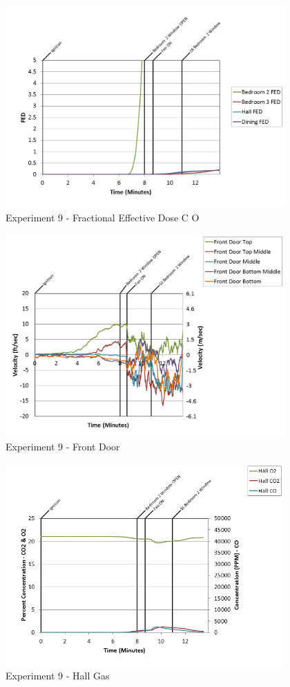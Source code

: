 \documentclass{article}
\begin{document}
\begin{appendices}
\begin{figure}[h!]
	\centering
	\includegraphics[height=3.05in]{0_Images/Results_Charts/Exp_9_Charts/FractionalEffectiveDoseCO.png}
	\caption{Experiment 9 - Fractional Effective Dose C O}
\end{figure}

\clearpage

\begin{figure}[h!]
	\centering
	\includegraphics[height=3.05in]{0_Images/Results_Charts/Exp_9_Charts/FrontDoor.png}
	\caption{Experiment 9 - Front Door}
\end{figure}


\begin{figure}[h!]
	\centering
	\includegraphics[height=3.05in]{0_Images/Results_Charts/Exp_9_Charts/HallGas.png}
	\caption{Experiment 9 - Hall Gas}
\end{figure}


\end{appendices}
\end{document}
